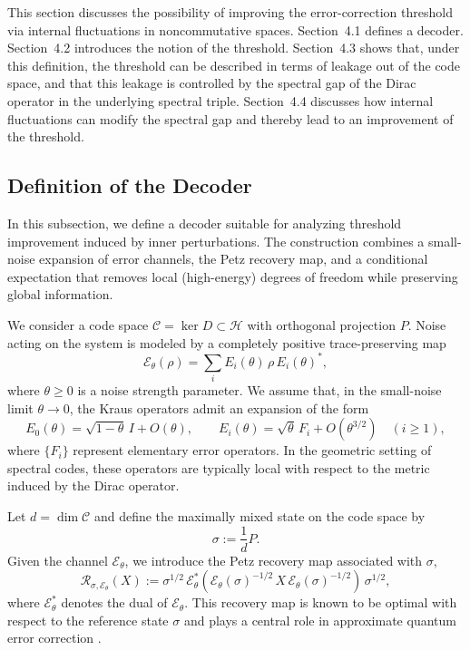 \documentclass[12pt]{article}
\theoremstyle{definition} %
\theoremstyle{plain} %
\theoremstyle{remark} %
\theoremstyle{underline}
\begin{document}
This section discusses the possibility of improving the error-correction threshold via internal fluctuations in noncommutative spaces.
Section~4.1 defines a decoder.
Section~4.2 introduces the notion of the threshold.
Section~4.3 shows that, under this definition, the threshold can be described in terms of leakage out of the code space, and that this leakage is controlled by the spectral gap of the Dirac operator in the underlying spectral triple.
Section~4.4 discusses how internal fluctuations can modify the spectral gap and thereby lead to an improvement of the threshold.

\subsection{Definition of the Decoder}

In this subsection, we define a decoder suitable for analyzing threshold improvement induced by inner perturbations.
The construction combines a small-noise expansion of error channels, the Petz recovery map, and a conditional expectation that removes local (high-energy) degrees of freedom while preserving global information.

We consider a code space $\mathcal{C}=\ker D\subset\mathcal{H}$ with orthogonal projection $P$.
Noise acting on the system is modeled by a completely positive
trace-preserving map
\[
    \mathcal{E}_\theta(\rho)
    =
    \sum_i E_i(\theta)\,\rho\,E_i(\theta)^\ast,
\]
where $\theta\ge 0$ is a noise strength parameter.
We assume that, in the small-noise limit $\theta\to 0$, the Kraus operators admit an expansion of the form
\[
    E_0(\theta)=\sqrt{1-\theta}\,I+O(\theta),
    \qquad
    E_i(\theta)=\sqrt{\theta}\,F_i+O(\theta^{3/2})
    \quad (i\ge 1),
\]
where $\{F_i\}$ represent elementary error operators.
In the geometric setting of spectral codes, these operators are typically local with respect to the metric induced by the Dirac operator.

Let $d=\dim\mathcal{C}$ and define the maximally mixed state on the code space by
\[
    \sigma:=\frac{1}{d}P.
\]
Given the channel $\mathcal{E}_\theta$, we introduce the Petz recovery map \cite{Petz:1986tvy} associated with $\sigma$,
\[
    \mathcal{R}_{\sigma,\mathcal{E}_\theta}(X)
    :=
    \sigma^{1/2}\,
    \mathcal{E}_\theta^\ast\!\left(
    \mathcal{E}_\theta(\sigma)^{-1/2}\,
    X\,
    \mathcal{E}_\theta(\sigma)^{-1/2}
    \right)\,
    \sigma^{1/2},
\]
where $\mathcal{E}_\theta^\ast$ denotes the dual of $\mathcal{E}_\theta$.
This recovery map is known to be optimal with respect to the reference state $\sigma$ and plays a central role in approximate quantum error correction \cite{hiai2011quantum,barnum2002reversing,fawzi2015quantum,berta2014monotonicity}.
\end{document}
